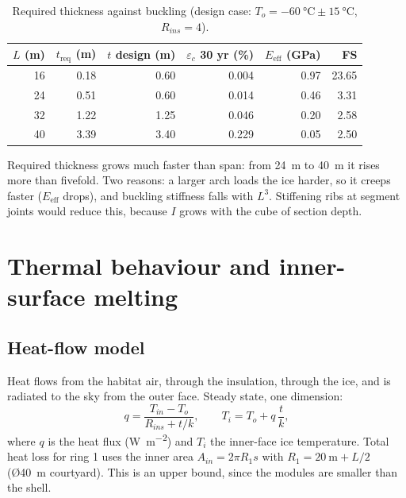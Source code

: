 \documentclass[11pt,a4paper]{article}
\begin{document}
\begin{table}[h]\centering\small
\caption{Required thickness against buckling (design case: $T_o=\SI{-60}{\celsius}\pm\SI{15}{\celsius}$, $R_{ins}=4$).}
\begin{tabular}{rrrrrr}\toprule
$L$ (\si{\metre}) & $t_{\text{req}}$ (\si{\metre}) & $t$ design (\si{\metre}) & $\varepsilon_c$ 30 yr (\si{\percent}) & $E_{\text{eff}}$ (\si{\giga\pascal}) & FS \\\midrule
\num{16} & \num{0.18} & \num{0.60} & \num{0.004} & \num{0.97} & \num{23.65} \\
\num{24} & \num{0.51} & \num{0.60} & \num{0.014} & \num{0.46} & \num{3.31} \\
\num{32} & \num{1.22} & \num{1.25} & \num{0.046} & \num{0.20} & \num{2.58} \\
\num{40} & \num{3.39} & \num{3.40} & \num{0.229} & \num{0.05} & \num{2.50} \\
\bottomrule\end{tabular}
\end{table}
Required thickness grows much faster than span: from \SI{24}{\metre} to \SI{40}{\metre} it rises more than fivefold. Two reasons: a larger arch loads the ice harder, so it creeps faster ($E_{\text{eff}}$ drops), and buckling stiffness falls with $L^3$. Stiffening ribs at segment joints would reduce this, because $I$ grows with the cube of section depth.

\section{Thermal behaviour and inner-surface melting}\label{sec:thermal}
\subsection{Heat-flow model}
Heat flows from the habitat air, through the insulation, through the ice, and is radiated to the sky from the outer face. Steady state, one dimension:
\begin{equation}
q=\frac{T_{in}-T_o}{R_{ins}+t/k},\qquad
T_i=T_o+q\,\frac{t}{k},
\end{equation}
where $q$ is the heat flux (\si{\watt\per\metre\squared}) and $T_i$ the inner-face ice temperature. Total heat loss for ring 1 uses the inner area $A_{in}=2\pi R_1 s$ with $R_1 = \SI{20}{\metre}+L/2$ (\O\SI{40}{\metre} courtyard). This is an upper bound, since the modules are smaller than the shell.
\end{document}
